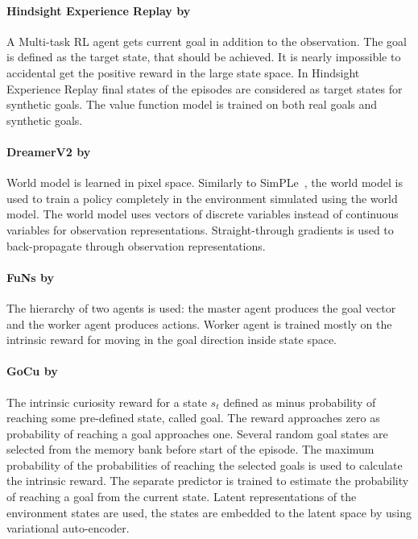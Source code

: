 \documentclass[acmsmall, nonacm]{acmart}
\begin{document}
\paragraph{Hindsight Experience Replay by~\citet{andrychowicz_hindsight_2017}} %
\label{par:hindsight}

A Multi-task RL agent gets current goal in addition to the observation. The goal is defined as the target state, that should be achieved. It is nearly impossible to accidental get the positive reward in the large state space. In Hindsight Experience Replay final states of the episodes are considered as target states for synthetic goals. The value function model is trained on both real goals and synthetic goals.


\paragraph{DreamerV2 by~\citet{Kaiser2020ModelBasedRL}} %
\label{par:dreamer_v2}

World model is learned in pixel space. Similarly to SimPLe~\citep{Kaiser2020ModelBasedRL}, the world model is used to train a policy completely in the environment simulated using the world model. The world model uses vectors of discrete variables instead of continuous variables for observation representations. Straight-through gradients is used to back-propagate through observation representations.


\paragraph{FuNs by~\citet{Vezhnevets2017FeUdalNF}} %
\label{par:funs}

The hierarchy of two agents is used: the master agent produces the goal vector and the worker agent produces actions. Worker agent is trained mostly on the intrinsic reward for moving in the goal direction inside state space.



\paragraph{GoCu by~\citet{Bougie2019SkillbasedCF}} %
\label{par:gocu}

The intrinsic curiosity reward for a state $s_t$ defined as minus probability of reaching some pre-defined state, called goal. The reward approaches zero as probability of reaching a goal approaches one. Several random goal states are selected from the memory bank before start of the episode. The maximum probability of the probabilities of reaching the selected goals is used to calculate the intrinsic reward. The separate predictor is trained to estimate the probability of reaching a goal from the current state. Latent representations of the environment states are used, the states are embedded to the latent space by using variational auto-encoder.
\end{document}
